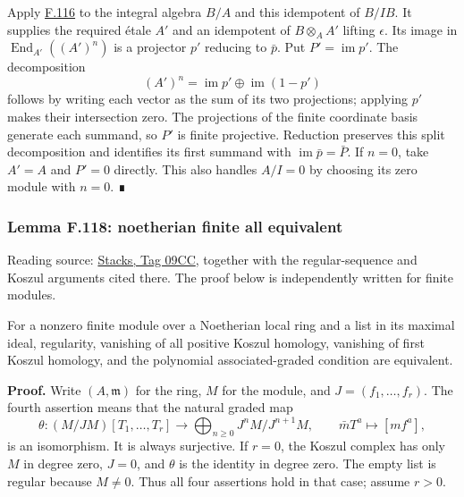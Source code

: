 \documentclass[11pt,a4paper,openany]{report}
\begin{document}
Apply \hyperref[AG-RG-S05-more-algebra-lemma-lift-idempotent-upstairs]{F.116} to the integral algebra \(B/A\) and this idempotent of \(B/IB\). It supplies the required étale \(A'\) and an idempotent of \(B\otimes_AA'\) lifting \(\epsilon\). Its image in \(\operatorname{End}_{A'}((A')^n)\) is a projector \(p'\) reducing to \(\bar p\). Put \(P'=\operatorname{im}p'\). The decomposition \[
(A')^n=\operatorname{im}p'\oplus\operatorname{im}(1-p')
\] follows by writing each vector as the sum of its two projections; applying \(p'\) makes their intersection zero. The projections of the finite coordinate basis generate each summand, so \(P'\) is finite projective. Reduction preserves this split decomposition and identifies its first summand with \(\operatorname{im}\bar p=\bar P\). If \(n=0\), take \(A'=A\) and \(P'=0\) directly. This also handles \(A/I=0\) by choosing its zero module with \(n=0\). ∎

\label{AG-RG-S05-more-algebra-lemma-noetherian-finite-all-equivalent}

\subsubsection{Lemma F.118: noetherian finite all equivalent}\label{AG-RG-S05-lemma-f.118-noetherian-finite-all-equivalent}

Reading source: \href{https://stacks.math.columbia.edu/tag/09CC}{Stacks, Tag 09CC}, together with the regular-sequence and Koszul arguments cited there. The proof below is independently written for finite modules.

For a nonzero finite module over a Noetherian local ring and a list in its maximal ideal, regularity, vanishing of all positive Koszul homology, vanishing of first Koszul homology, and the polynomial associated-graded condition are equivalent.

\textbf{Proof.} Write \((A,\mathfrak m)\) for the ring, \(M\) for the module, and \(J=(f_1,\ldots,f_r)\). The fourth assertion means that the natural graded map \[\theta:(M/JM)[T_1,\ldots,T_r]\longrightarrow\bigoplus_{n\geq0}J^nM/J^{n+1}M,\qquad \bar mT^a\longmapsto[mf^a],\] is an isomorphism. It is always surjective. If \(r=0\), the Koszul complex has only \(M\) in degree zero, \(J=0\), and \(\theta\) is the identity in degree zero. The empty list is regular because \(M\ne0\). Thus all four assertions hold in that case; assume \(r>0\).
\end{document}
